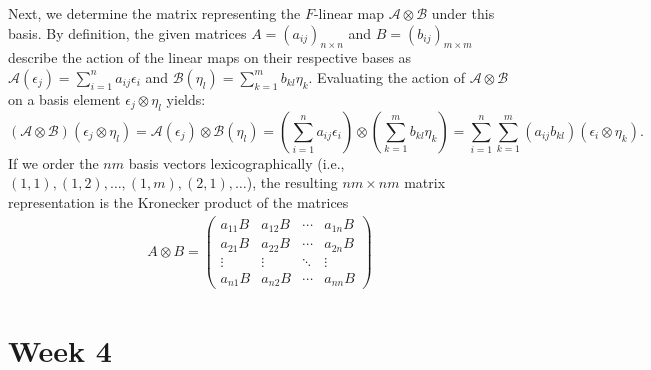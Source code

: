 \begin{solution}
    Next, we determine the matrix representing the $F$-linear map $\mathscr{A} \otimes \mathscr{B}$ under this basis. 
    By definition, the given matrices $A = (a_{ij})_{n \times n}$ and $B = (b_{ij})_{m \times m}$ describe the action of the linear maps on their respective bases as $\mathscr{A}(\epsilon_j) = \sum_{i=1}^n a_{ij} \epsilon_i$ and $\mathscr{B}(\eta_l) = \sum_{k=1}^m b_{kl} \eta_k$. 
    Evaluating the action of $\mathscr{A} \otimes \mathscr{B}$ on a basis element $\epsilon_j \otimes \eta_l$ yields:$$(\mathscr{A} \otimes \mathscr{B})(\epsilon_j \otimes \eta_l) = \mathscr{A}(\epsilon_j) \otimes \mathscr{B}(\eta_l) = \left(\sum_{i=1}^n a_{ij} \epsilon_i\right) \otimes \left(\sum_{k=1}^m b_{kl} \eta_k\right) = \sum_{i=1}^n \sum_{k=1}^m (a_{ij} b_{kl}) (\epsilon_i \otimes \eta_k).$$
    If we order the $nm$ basis vectors lexicographically (i.e., $(1,1), (1,2), \dots, (1,m), (2,1), \dots$), the resulting $nm \times nm$ matrix representation is the Kronecker product of the matrices
    \begin{align*}
        A \otimes B = \begin{pmatrix} a_{11}B & a_{12}B & \cdots & a_{1n}B \\ a_{21}B & a_{22}B & \cdots & a_{2n}B \\ \vdots & \vdots & \ddots & \vdots \\ a_{n1}B & a_{n2}B & \cdots & a_{nn}B \end{pmatrix}
    \end{align*}
\end{solution}


\section{Week 4}
